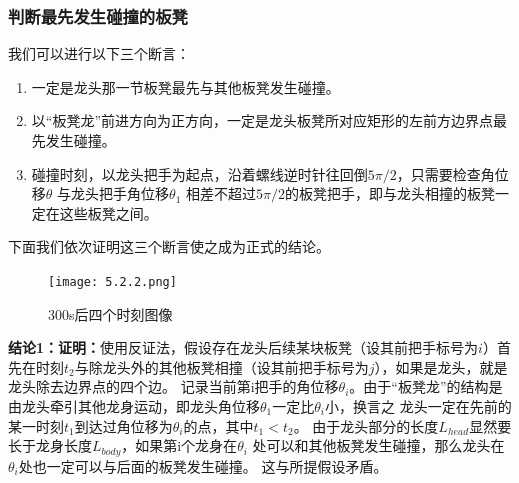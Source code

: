 \documentclass{cumcmthesis1}
\begin{document}
\subsubsection{判断最先发生碰撞的板凳}
\par
我们可以进行以下三个断言：
\begin{enumerate}
    \item 一定是龙头那一节板凳最先与其他板凳发生碰撞。
    \item 以“板凳龙”前进方向为正方向，一定是龙头板凳所对应矩形的左前方边界点最先发生碰撞。
    \item 碰撞时刻，以龙头把手为起点，沿着螺线逆时针往回倒$ 5 \pi/2$，只需要检查角位移$\theta$
    与龙头把手角位移$\theta_1$ 相差不超过$ 5 \pi/2$的板凳把手，即与龙头相撞的板凳一定在这些板凳之间。
\end{enumerate}
\par
下面我们依次证明这三个断言使之成为正式的结论。
\begin{figure}
    \caption{300s后四个时刻图像}
    \centering    
    \texttt{[image: 5.2.2.png]}
\end{figure}
\par
\textbf{结论1：证明：}使用反证法，假设存在龙头后续某块板凳（设其前把手标号为$i$）首先在时刻$t_2$与除龙头外的其他板凳相撞（设其前把手标号为$j$），如果是龙头，就是龙头除去边界点的四个边。
记录当前第i把手的角位移$\theta_i$。由于“板凳龙”的结构是由龙头牵引其他龙身运动，即龙头角位移$\theta_1$一定比$\theta_i$小，换言之
龙头一定在先前的某一时刻$t_1$到达过角位移为$\theta_i$的点，其中$t_1<t_2$。
由于龙头部分的长度$L_{head}$显然要长于龙身长度$L_{body}$，如果第i个龙身在$\theta_i$
处可以和其他板凳发生碰撞，那么龙头在$\theta_i$处也一定可以与后面的板凳发生碰撞。
这与所提假设矛盾。
\end{document}
